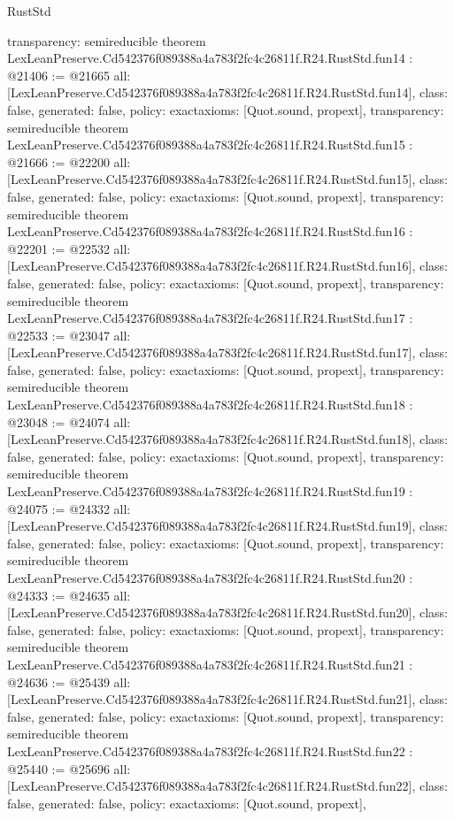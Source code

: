 \begin{lexlean}{RustStd}
\begin{coremodule}
{  transparency: semireducible
}
theorem LexLeanPreserve.Cd542376f089388a4a783f2fc4c26811f.R24.RustStd.fun14 : @21406 := @21665 {
  all: [LexLeanPreserve.Cd542376f089388a4a783f2fc4c26811f.R24.RustStd.fun14],
  class: false,
  generated: false,
  policy: exact{axioms: [Quot.sound, propext]},
  transparency: semireducible
}
theorem LexLeanPreserve.Cd542376f089388a4a783f2fc4c26811f.R24.RustStd.fun15 : @21666 := @22200 {
  all: [LexLeanPreserve.Cd542376f089388a4a783f2fc4c26811f.R24.RustStd.fun15],
  class: false,
  generated: false,
  policy: exact{axioms: [Quot.sound, propext]},
  transparency: semireducible
}
theorem LexLeanPreserve.Cd542376f089388a4a783f2fc4c26811f.R24.RustStd.fun16 : @22201 := @22532 {
  all: [LexLeanPreserve.Cd542376f089388a4a783f2fc4c26811f.R24.RustStd.fun16],
  class: false,
  generated: false,
  policy: exact{axioms: [Quot.sound, propext]},
  transparency: semireducible
}
theorem LexLeanPreserve.Cd542376f089388a4a783f2fc4c26811f.R24.RustStd.fun17 : @22533 := @23047 {
  all: [LexLeanPreserve.Cd542376f089388a4a783f2fc4c26811f.R24.RustStd.fun17],
  class: false,
  generated: false,
  policy: exact{axioms: [Quot.sound, propext]},
  transparency: semireducible
}
theorem LexLeanPreserve.Cd542376f089388a4a783f2fc4c26811f.R24.RustStd.fun18 : @23048 := @24074 {
  all: [LexLeanPreserve.Cd542376f089388a4a783f2fc4c26811f.R24.RustStd.fun18],
  class: false,
  generated: false,
  policy: exact{axioms: [Quot.sound, propext]},
  transparency: semireducible
}
theorem LexLeanPreserve.Cd542376f089388a4a783f2fc4c26811f.R24.RustStd.fun19 : @24075 := @24332 {
  all: [LexLeanPreserve.Cd542376f089388a4a783f2fc4c26811f.R24.RustStd.fun19],
  class: false,
  generated: false,
  policy: exact{axioms: [Quot.sound, propext]},
  transparency: semireducible
}
theorem LexLeanPreserve.Cd542376f089388a4a783f2fc4c26811f.R24.RustStd.fun20 : @24333 := @24635 {
  all: [LexLeanPreserve.Cd542376f089388a4a783f2fc4c26811f.R24.RustStd.fun20],
  class: false,
  generated: false,
  policy: exact{axioms: [Quot.sound, propext]},
  transparency: semireducible
}
theorem LexLeanPreserve.Cd542376f089388a4a783f2fc4c26811f.R24.RustStd.fun21 : @24636 := @25439 {
  all: [LexLeanPreserve.Cd542376f089388a4a783f2fc4c26811f.R24.RustStd.fun21],
  class: false,
  generated: false,
  policy: exact{axioms: [Quot.sound, propext]},
  transparency: semireducible
}
theorem LexLeanPreserve.Cd542376f089388a4a783f2fc4c26811f.R24.RustStd.fun22 : @25440 := @25696 {
  all: [LexLeanPreserve.Cd542376f089388a4a783f2fc4c26811f.R24.RustStd.fun22],
  class: false,
  generated: false,
  policy: exact{axioms: [Quot.sound, propext]},
}
\end{coremodule}
\end{lexlean}
